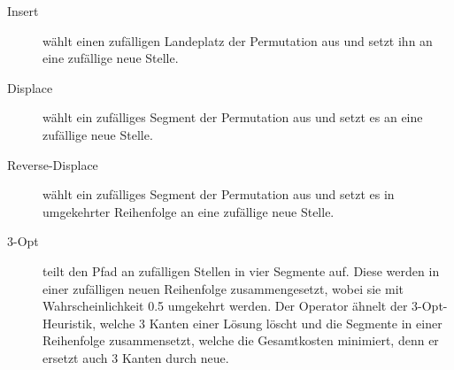 \documentclass[a4paper,10pt,ngerman]{scrartcl}
\begin{document}
\begin{description}
  \item[Insert] wählt einen zufälligen Landeplatz der Permutation aus und setzt ihn an
    eine zufällige neue Stelle.
  \item[Displace] wählt ein zufälliges Segment der Permutation aus und setzt es an eine
    zufällige neue Stelle.
  \item[Reverse-Displace] wählt ein zufälliges Segment der Permutation aus und setzt es
    in umgekehrter Reihenfolge an eine zufällige neue Stelle.
  \item[3-Opt] teilt den Pfad an zufälligen Stellen in vier Segmente auf. Diese werden 
  in einer zufälligen neuen Reihenfolge zusammengesetzt, wobei sie mit Wahrscheinlichkeit 
  0.5 umgekehrt werden. Der Operator ähnelt der 3-Opt-Heuristik, welche 3 Kanten einer 
  Lösung löscht und die Segmente in einer Reihenfolge zusammensetzt, welche die Gesamtkosten 
  minimiert, denn er ersetzt auch 3 Kanten durch neue.
\end{description}
\end{document}
